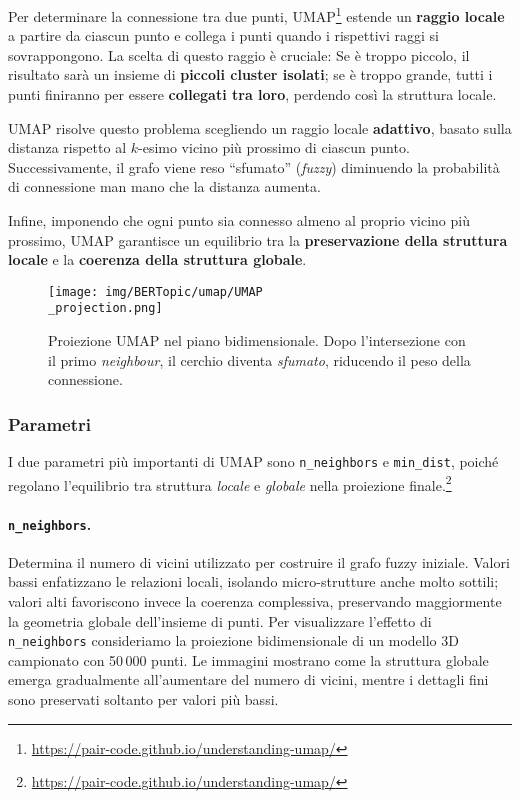 Per determinare la connessione tra due punti, UMAP\footnote{\url{https://pair-code.github.io/understanding-umap/}} estende un \textbf{raggio locale} a partire da ciascun punto e collega i punti quando i rispettivi raggi si sovrappongono. La scelta di questo raggio è cruciale:
Se è troppo piccolo, il risultato sarà un insieme di \textbf{piccoli cluster isolati};
se è troppo grande, tutti i punti finiranno per essere \textbf{collegati tra loro}, perdendo così la struttura locale.

UMAP risolve questo problema scegliendo un raggio locale \textbf{adattivo}, basato sulla distanza rispetto al $k$-esimo vicino più prossimo di ciascun punto. Successivamente, il grafo viene reso ``sfumato'' (\textit{fuzzy}) diminuendo la probabilità di connessione man mano che la distanza aumenta.

Infine, imponendo che ogni punto sia connesso almeno al proprio vicino più prossimo, UMAP garantisce un equilibrio tra la \textbf{preservazione della struttura locale} e la \textbf{coerenza della struttura globale}.
\begin{figure}[H]
\centering
\texttt{[image: img/BERTopic/umap/UMAP\\\_projection.png]}
\caption{Proiezione UMAP nel piano bidimensionale. Dopo l'intersezione con il primo \emph{neighbour}, il cerchio diventa \emph{sfumato}, riducendo il peso della connessione.\protect\footnotemark}
\label{fig:umap-projection}
\end{figure}
\subsubsection{Parametri}
I due parametri più importanti di UMAP sono \texttt{n\_neighbors} e \texttt{min\_dist}, poiché regolano l'equilibrio tra struttura \textit{locale} e \textit{globale} nella proiezione finale.\footnote{\url{https://pair-code.github.io/understanding-umap/}}

\paragraph{\texttt{n\_neighbors}.} Determina il numero di vicini utilizzato per costruire il grafo fuzzy iniziale. Valori bassi enfatizzano le relazioni locali, isolando micro-strutture anche molto sottili; valori alti favoriscono invece la coerenza complessiva, preservando maggiormente la geometria globale dell'insieme di punti.
Per visualizzare l'effetto di \texttt{n\_neighbors} consideriamo la proiezione bidimensionale di un modello 3D campionato con 50\,000 punti. Le immagini mostrano come la struttura globale emerga gradualmente all'aumentare del numero di vicini, mentre i dettagli fini sono preservati soltanto per valori più bassi.

